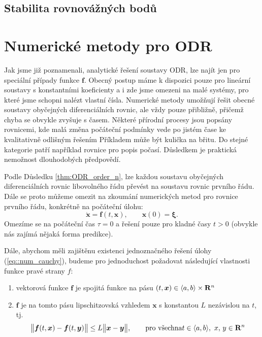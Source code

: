 \documentclass[a4paper, 12pt]{book}
\theoremstyle{definition}
\def\Real{{\rm\bf R}}
\def\vc#1{\mathbf{\boldsymbol{#1}}}     %
\def\norm#1{\bigl\Vert#1\bigr\Vert} %
\begin{document}
\section{Stabilita rovnovážných bodů}
\label{stabilita_ODR}



\chapter{Numerické metody pro ODR}
Jak jsme již poznamenali, analytické řešení soustavy ODR, lze najít jen pro speciální případy funkce $\vc f$. Obecný postup máme k dispozici 
pouze pro lineární soustavy s konstantními koeficienty a i zde jsme omezeni na malé systémy, pro které jsme schopni nalézt vlastní čísla.
Numerické metody umožňují řešit obecné soustavy obyčejných diferenciálních rovnic, ale vždy pouze přibližně, přičemž chyba se obvykle zvyšuje s časem.
Některé přírodní procesy jsou popsány rovnicemi, kde malá změna počáteční podmínky vede po jistém čase ke kvalitativně odlišným řešením
Příkladem může být kulička na břitu. Do stejné kategorie patří například rovnice pro popis počasí. Důsledkem je praktická nemožnost 
dlouhodobých předpovědí.

Podle Důsledku \ref{thm:ODR_order_n}, lze každou soustavu obyčejných diferenciálních rovnic libovolného řádu převést na soustavu rovnic prvního řádu.
Dále se proto můžeme omezit na zkoumání numerických metod pro rovnice prvního řádu, konkrétně na počáteční úlohu:
\begin{equation}
  \label{eq::num_cauchy}
  \dot{\vc x}=\vc f(t,\vc x),\qquad\vc x(0)=\vc \xi.
\end{equation}
Omezíme se na počáteční čas $\tau =0$ a řešení pouze pro kladné časy $t>0$ (obvykle nás zajímá nějaká forma predikce).

Dále, abychom měli zajištěnu existenci jednoznačného řešení úlohy (\ref{eq::num_cauchy}),
budeme pro jednoduchost požadovat následující vlastnosti funkce pravé strany $f$:
\begin{enumerate}
 \item vektorová funkce $\vc f$ je spojitá funkce na pásu $(t,\vc x) \in \langle a,b\rangle\times \Real^n$
 \item $\vc f$ je na tomto pásu lipschitzovská vzhledem $\vc x$ s konstantou $L$ nezávislou na $t$, tj.
 \[
    \norm{\vc f(t, \vc x) - \vc f(t, \vc y)} \le L \norm{\vc x - \vc y}, \qquad \text{pro všechna} t\in\langle a,b \rangle,\ x,\,y \in \Real^n
 \]
\end{enumerate}
\end{document}
